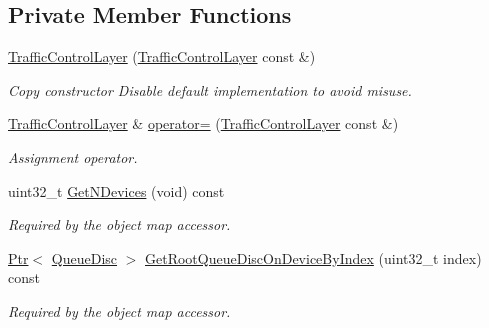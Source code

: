 \subsection*{Private Member Functions}
\begin{DoxyCompactItemize}
\item 
\hyperlink{classns3_1_1TrafficControlLayer_ae017567979012a6b833b98d315d939a9}{Traffic\+Control\+Layer} (\hyperlink{classns3_1_1TrafficControlLayer}{Traffic\+Control\+Layer} const \&)
\begin{DoxyCompactList}\small\item\em Copy constructor Disable default implementation to avoid misuse. \end{DoxyCompactList}\item 
\hyperlink{classns3_1_1TrafficControlLayer}{Traffic\+Control\+Layer} \& \hyperlink{classns3_1_1TrafficControlLayer_a5825d763cf9b982cff9940c150d4eac8}{operator=} (\hyperlink{classns3_1_1TrafficControlLayer}{Traffic\+Control\+Layer} const \&)
\begin{DoxyCompactList}\small\item\em Assignment operator. \end{DoxyCompactList}\item 
uint32\+\_\+t \hyperlink{classns3_1_1TrafficControlLayer_ab5d6a1d820a9ce62afcb2eb95a9110cd}{Get\+N\+Devices} (void) const 
\begin{DoxyCompactList}\small\item\em Required by the object map accessor. \end{DoxyCompactList}\item 
\hyperlink{classns3_1_1Ptr}{Ptr}$<$ \hyperlink{classns3_1_1QueueDisc}{Queue\+Disc} $>$ \hyperlink{classns3_1_1TrafficControlLayer_a6712e320745fa4279b4acb22d1e88848}{Get\+Root\+Queue\+Disc\+On\+Device\+By\+Index} (uint32\+\_\+t index) const 
\begin{DoxyCompactList}\small\item\em Required by the object map accessor. \end{DoxyCompactList}\end{DoxyCompactItemize}
